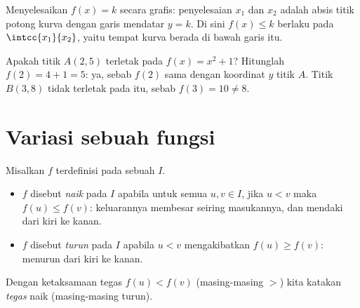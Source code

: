 \begin{omfigure}

{\small Menyelesaikan $f(x) = k$ secara grafis: penyelesaian $x_1$ dan $x_2$
adalah absis titik potong kurva dengan garis mendatar
$y = k$. Di sini $f(x) \leq k$ berlaku pada $\intcc{x_1}{x_2}$, yaitu tempat
kurva berada di bawah garis itu.}
\end{omfigure}

\begin{example}\label{ex:g10:functions:membership}
Apakah titik $A(2, 5)$ terletak pada  $f(x) = x^2 + 1$? Hitunglah
$f(2) = 4 + 1 = 5$: ya, sebab $f(2)$ sama dengan koordinat $y$ titik $A$.
Titik $B(3, 8)$ tidak terletak pada  itu, sebab $f(3) = 10 \neq 8$.
\end{example}

\section{Variasi sebuah fungsi}

\begin{definition}\label{def:g10:functions:variations}
Misalkan $f$ terdefinisi pada sebuah  $I$.
\begin{itemize}
  \item $f$ disebut \emph{naik} pada $I$ apabila
        untuk semua $u, v \in I$, jika $u < v$ maka $f(u) \leq f(v)$:
        keluarannya membesar seiring masukannya, dan  mendaki dari
        kiri ke kanan.
  \item $f$ disebut \emph{turun} pada $I$ apabila
        $u < v$ mengakibatkan $f(u) \geq f(v)$:  menurun dari kiri
        ke kanan.
\end{itemize}
Dengan ketaksamaan tegas $f(u) < f(v)$ (masing-masing $>$) kita katakan
\emph{tegas} naik (masing-masing turun).
\end{definition}

